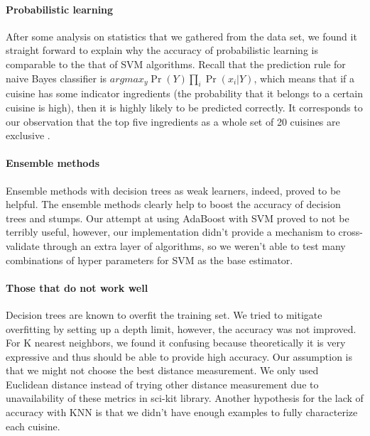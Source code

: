\paragraph{Probabilistic learning} After some analysis on statistics
that we gathered from the data set, we found it straight forward to
explain why the accuracy of probabilistic learning is comparable to
the that of SVM algorithms. Recall that the prediction rule for naive Bayes
classifier is $argmax_y \Pr(Y)\prod_{i} \Pr(x_i|Y)$, which means that
if a cuisine has some indicator ingredients (the probability that it
belongs to a certain cuisine is high), then it is highly likely to be
predicted correctly. It corresponds to our observation that the top
five ingredients as a whole set of 20 cuisines are exclusive . %
 
\paragraph{Ensemble methods} Ensemble methods with decision trees as
weak learners, indeed, proved to be helpful.  The ensemble methods
clearly help to boost the accuracy of decision trees and stumps.  Our
attempt at using AdaBoost with SVM proved to not be terribly useful,
however, our implementation didn't provide a mechanism to
cross-validate through an extra layer of algorithms, so we weren't
able to test many combinations of hyper parameters for SVM as the base
estimator.  


\paragraph{Those that do not work well} Decision trees are known to
overfit the training set. We tried to mitigate overfitting by setting
up a depth limit, however, the accuracy was not improved. For K nearest
neighbors, we found it confusing because theoretically it is very
expressive and thus should be able to provide high accuracy. Our
assumption is that we might not choose the best distance
measurement. We only used Euclidean distance instead of trying other
distance measurement due to unavailability of these metrics in sci-kit
library.  Another hypothesis for the lack of accuracy with KNN is that
we didn't have enough examples to fully characterize each cuisine.